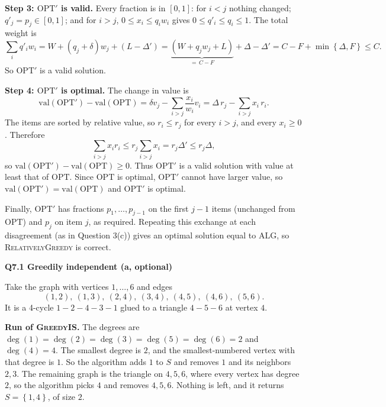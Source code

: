 \documentclass[11pt]{article}
\newcommand{\set}[1]{\left\{#1\right\}}
\newcommand{\OPT}{\mathrm{OPT}}
\newcommand{\ALG}{\mathrm{ALG}}
\newcommand{\algo}[1]{\textsc{#1}}
\newcommand{\qpage}[1]{\clearpage\noindent\textbf{\large #1}\par\medskip}
\begin{document}
\textbf{Step 3: $\OPT'$ is valid.}
Every fraction is in $[0,1]$: for $i<j$ nothing changed; $q'_j = p_j \in [0,1]$; and for $i > j$, $0 \le x_i \le q_i w_i$ gives $0 \le q'_i \le q_i \le 1$.
The total weight is
\[
  \sum_i q'_i w_i
  = W + (q_j + \delta) w_j + (L - \Delta')
  = \underbrace{(W + q_j w_j + L)}_{=\,C - F} + \Delta - \Delta'
  = C - F + \min\set{\Delta, F} \le C .
\]
So $\OPT'$ is a valid solution.

\textbf{Step 4: $\OPT'$ is optimal.}
The change in value is
\[
  \text{val}(\OPT') - \text{val}(\OPT) = \delta v_j - \sum_{i>j} \frac{x_i}{w_i} v_i = \Delta\, r_j - \sum_{i>j} x_i\, r_i .
\]
The items are sorted by relative value, so $r_i \le r_j$ for every $i > j$, and every $x_i \ge 0$.
Therefore
\[
  \sum_{i>j} x_i r_i \le r_j \sum_{i>j} x_i = r_j \Delta' \le r_j \Delta,
\]
so $\text{val}(\OPT') - \text{val}(\OPT) \ge 0$.
Thus $\OPT'$ is a valid solution with value at least that of $\OPT$.
Since $\OPT$ is optimal, $\OPT'$ cannot have larger value, so $\text{val}(\OPT') = \text{val}(\OPT)$ and $\OPT'$ is optimal.

Finally, $\OPT'$ has fractions $p_1,\dots,p_{j-1}$ on the first $j-1$ items (unchanged from $\OPT$) and $p_j$ on item $j$, as required.
Repeating this exchange at each disagreement (as in Question 3(c)) gives an optimal solution equal to $\ALG$, so \algo{RelativelyGreedy} is correct.
    

\qpage{Q7.1 Greedily independent (a, optional)}

Take the graph with vertices $1,\dots,6$ and edges
\[
  (1,2),\ (1,3),\ (2,4),\ (3,4),\ (4,5),\ (4,6),\ (5,6).
\]
It is a 4-cycle $1\!-\!2\!-\!4\!-\!3\!-\!1$ glued to a triangle $4\!-\!5\!-\!6$ at vertex $4$.

\begin{center}
\end{center}

\textbf{Run of \algo{GreedyIS}.}
The degrees are $\deg(1)=\deg(2)=\deg(3)=\deg(5)=\deg(6)=2$ and $\deg(4)=4$.
The smallest degree is $2$, and the smallest-numbered vertex with that degree is $1$.
So the algorithm adds $1$ to $S$ and removes $1$ and its neighbors $2,3$.
The remaining graph is the triangle on $4,5,6$, where every vertex has degree $2$, so the algorithm picks $4$ and removes $4,5,6$.
Nothing is left, and it returns $S = \set{1,4}$, of size $2$.
\end{document}
